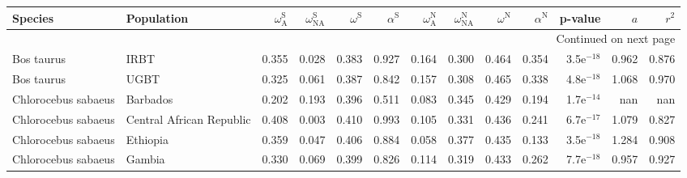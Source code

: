 \begin{longtable}{llrrrrrrrrrrr}
\toprule
             Species &                Population & $\omega_{\textrm{A}}^{\textrm{S}}$ & $\omega_{\textrm{NA}}^{\textrm{S}}$ & $\omega^{\textrm{S}}$ & $\alpha^{\textrm{S}}$ & $\omega_{\textrm{A}}^{\textrm{N}}$ & $\omega_{\textrm{NA}}^{\textrm{N}}$ & $\omega^{\textrm{N}}$ & $\alpha^{\textrm{N}}$ &      p-value &    $a$ &  $r^2$ \\
\midrule
\endhead
\midrule
\multicolumn{13}{r}{{Continued on next page}} \\
\midrule
\endfoot

\bottomrule
\endlastfoot
          Bos taurus &                      IRBT &                              0.355 &                               0.028 &                 0.383 &                 0.927 &                              0.164 &                               0.300 &                 0.464 &                 0.354 & 3.5e$^{-18}$ &  0.962 &  0.876 \\
          Bos taurus &                      UGBT &                              0.325 &                               0.061 &                 0.387 &                 0.842 &                              0.157 &                               0.308 &                 0.465 &                 0.338 & 4.8e$^{-18}$ &  1.068 &  0.970 \\
 Chlorocebus sabaeus &                  Barbados &                              0.202 &                               0.193 &                 0.396 &                 0.511 &                              0.083 &                               0.345 &                 0.429 &                 0.194 & 1.7e$^{-14}$ &    nan &    nan \\
 Chlorocebus sabaeus &  Central African Republic &                              0.408 &                               0.003 &                 0.410 &                 0.993 &                              0.105 &                               0.331 &                 0.436 &                 0.241 & 6.7e$^{-17}$ &  1.079 &  0.827 \\
 Chlorocebus sabaeus &                  Ethiopia &                              0.359 &                               0.047 &                 0.406 &                 0.884 &                              0.058 &                               0.377 &                 0.435 &                 0.133 & 3.5e$^{-18}$ &  1.284 &  0.908 \\
 Chlorocebus sabaeus &                    Gambia &                              0.330 &                               0.069 &                 0.399 &                 0.826 &                              0.114 &                               0.319 &                 0.433 &                 0.262 & 7.7e$^{-18}$ &  0.957 &  0.927 \\

\end{longtable}

